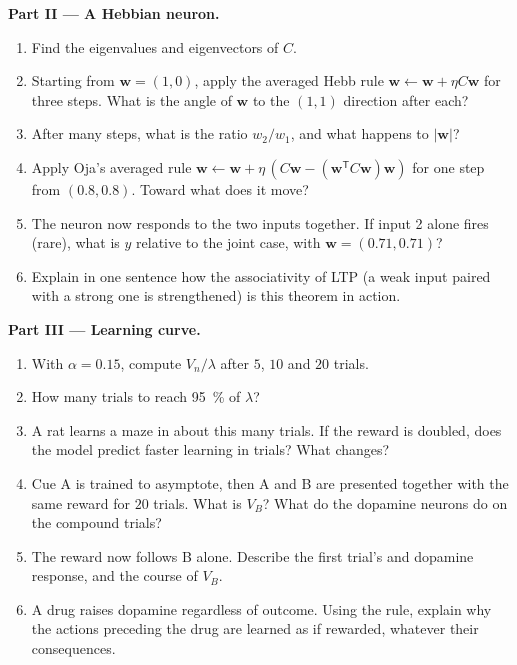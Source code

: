 \begin{problem}
\medskip
\noindent\textbf{Part II --- A Hebbian neuron.}
\begin{enumerate}[resume]
  \item Find the eigenvalues and eigenvectors of $C$.
  \item Starting from $\mathbf{w} = (1, 0)$, apply the averaged Hebb
        rule $\mathbf{w} \leftarrow \mathbf{w} + \eta C\mathbf{w}$ for
        three steps. What is the angle of $\mathbf{w}$ to the $(1,1)$
        direction after each?
  \item After many steps, what is the ratio $w_{2}/w_{1}$, and what
        happens to $|\mathbf{w}|$?
  \item Apply Oja's averaged rule $\mathbf{w} \leftarrow \mathbf{w} +
        \eta\,(C\mathbf{w} - (\mathbf{w}^{\mathsf{T}}C\mathbf{w})
        \mathbf{w})$ for one step from $(0.8, 0.8)$. Toward what does
        it move?
  \item The neuron now responds to the two inputs together. If input 2
        alone fires (rare), what is $y$ relative to the joint case,
        with $\mathbf{w} = (0.71, 0.71)$?
  \item Explain in one sentence how the associativity of LTP (a weak
        input paired with a strong one is strengthened) is this
        theorem in action.
\end{enumerate}

\medskip
\noindent\textbf{Part III --- Learning curve.}
\begin{enumerate}[resume]
  \item With $\alpha = 0.15$, compute $V_{n}/\lambda$ after $5$, $10$
        and $20$ trials.
  \item How many trials to reach \qty{95}{\%} of $\lambda$?
  \item A rat learns a maze in about this many trials. If the reward is
        doubled, does the model predict faster learning in trials? What
        changes?
  \item Cue A is trained to asymptote, then A and B are presented
        together with the same reward for $20$ trials. What is $V_{B}$?
        What do the dopamine neurons do on the compound trials?
  \item The reward now follows B alone. Describe the first trial's
         and dopamine response, and the course of
        $V_{B}$.
  \item A drug raises dopamine regardless of outcome. Using the rule,
        explain why the actions preceding the drug are learned as if
        rewarded, whatever their consequences.
\end{enumerate}


\end{problem}
